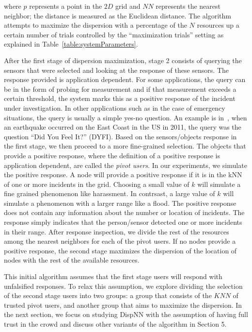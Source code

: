 \documentclass{acm_proc_article-sp}
\begin{document}
where $p$ represents a point in the $2D$ grid and $NN$ represents the nearest neighbor; the distance is measured as the Euclidean distance. The algorithm attempts to maximize the dispersion with a percentage of the $N$ resources up a certain number of trials controlled by the ``maximization trials'' setting as explained in Table~\ref{table:systemParameters}. \par
After the first stage of dispersion maximization, stage 2 consists of querying the sensors that were selected and looking at the response of these sensors. The response provided is application dependent. For some applications, the query can be in the form of probing for measurement and if that measurement exceeds a certain threshold, the system marks this as a positive response of the incident under investigation. In other applications such as in the case of emergency situations, the query is usually a simple yes-no question. An example is in~\cite{crooks2013earthquake}, when an earthquake occurred on the East Coast in the US in 2011, the query was the question ``Did You Feel It?'' (DYFI). Based on the sensors/objects response in the first stage, we then proceed to a more fine-grained selection. The objects that provide a positive response, where the definition of a positive response is application dependent, are called the \textit{pivot users}. In our experiments, we simulate the positive response. A node will provide a positive response if it is in the kNN of one or more incidents in the grid. Choosing a small value of $k$ will simulate a fine grained phenomenon like harassment. In contrsast, a large value of $k$ will simulate a phenomenon with a larger range like a flood. The positive response does not contain any information about the number or location of incidents. The response simply indicates that the person/sensor detected one or more incidents in their range. After response inspection, we divide the rest of the resources among the nearest neighbors for each of the pivot users. If no nodes provide a positive response, the second stage maximizes the dispersion of the location of nodes with the rest of the available resources. \par

This initial algorithm assumes that the first stage users will respond with unfalsified responses. To relax this assumption, we explore dividing the selection of the second stage users into two groups: a group that consists of the $KNN$ of trusted pivot users, and another group that aims to maximize the dispersion. In the next section, we focus on studying DispNN with the assumption of having full trust in the crowd and discuss other variants of the algorithm in Section 5.\par
\end{document}
